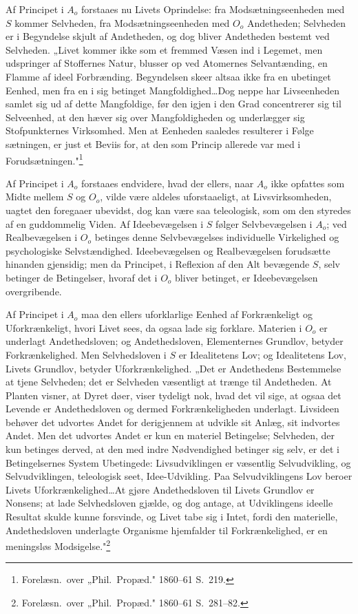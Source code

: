 \documentclass[12pt]{book}
\newcommand{\opage}[1]{\marginnote{\footnotesize\textit{[#1]}}}
\newcommand{\apage}[1]{\marginnote{\footnotesize\textit{[#1]}}}
\begin{document}
Af Principet i $A_o$ forstaaes nu Livets Oprindelse: fra Modsætningseenheden med $S$ kommer Selvheden,
fra Modsætningseenheden med $O_o$ Andetheden; Selvheden er i Begyndelse skjult af Andetheden, og dog
bliver Andetheden bestemt ved Selvheden. „Livet kommer ikke som et fremmed Væsen ind i Legemet, men
udspringer af Stoffernes Natur, blusser op ved Atomernes Selvantænding, en Flamme af ideel
Forbrænding. Begyndelsen skeer altsaa ikke fra en ubetinget Eenhed, men fra en i sig betinget
Mangfoldighed\ldots Dog neppe har Livseenheden samlet sig ud af dette Mangfoldige, før den igjen i den
Grad concentrerer sig til Selveenhed, at den hæver sig over Mangfoldigheden og underlægger sig
Stofpunkternes Virksomhed. Men at Eenheden saaledes resulterer i Følge\-%
 \apage{445}sætningen, er just et Beviis for, at den som Princip allerede var med i
Forudsætningen."\footnote{Forelæsn.\ over „Phil.\ Propæd." 1860--61 S.~219.}

Af Principet i $A_o$ forstaaes endvidere, hvad der ellers, naar $A_o$ ikke opfattes som Midte mellem
$S$ og $O_o$, vilde være aldeles uforstaaeligt, at Livsvirksomheden, uagtet den foregaaer ubevidst,
dog kan være saa teleologisk, som om den styredes af en guddommelig Viden. Af Ideebevægelsen i $S$
følger Selvbevægelsen i $A_o$; ved Realbevægelsen i $O_o$ betinges denne Selvbevægelses individuelle
Virkelighed og psychologiske Selvstændighed. Ideebevægelsen og Realbevægelsen forudsætte hinanden
gjensidig; men da Principet, i Reflexion af den Alt bevægende $S$, selv betinger de Betingelser,
hvoraf det i $O_o$ bliver betinget, er Ideebevægelsen overgribende.

Af Principet i $A_o$ maa den ellers uforklarlige Eenhed af Forkrænkeligt og Uforkrænkeligt, hvori
Livet sees, da ogsaa lade sig forklare. Materien i $O_o$ er underlagt Andethedsloven; og
Andethedsloven, Elementernes Grundlov, betyder Forkrænkelighed. Men Selvhedsloven i $S$ er
Idealitetens Lov; og Idealitetens Lov, Livets Grundlov, betyder Uforkrænkelighed. „Det er Andethedens
Bestemmelse at tjene Selvheden; det er Selvheden væsentligt at trænge til Andetheden. At Planten
visner, at Dyret døer, viser tydeligt nok, hvad det vil sige, at ogsaa det Levende er Andethedsloven
og dermed Forkrænkeligheden underlagt. Livsideen behøver det udvortes Andet for derigjennem at udvikle
sit Anlæg, sit indvortes Andet. Men det udvortes Andet er kun en materiel Betingelse; Selvheden, der
kun betinges derved, at den med indre Nødvendighed betinger sig selv, er det i Betingelsernes System
Ubetingede: Livsudviklingen er væsentlig Selvudvikling, og Selvudviklingen, teleologisk seet,
Idee-Udvikling. Paa Selvudviklingens Lov beroer Livets Uforkrænkelighed\ldots At gjøre Andethedsloven
til Livets Grundlov er Nonsens; at lade
\opage{446} Selvhedsloven gjælde, og dog antage, at Udviklingens ideelle Resultat skulde kunne forsvinde, og Livet
tabe sig i Intet, fordi den materielle, Andethedsloven underlagte Organisme hjemfalder til
Forkrænkelighed, er en meningsløs Modsigelse."\footnote{Forelæsn.\ over „Phil.\ Propæd." 1860--61
S.~281--82.}
\end{document}
